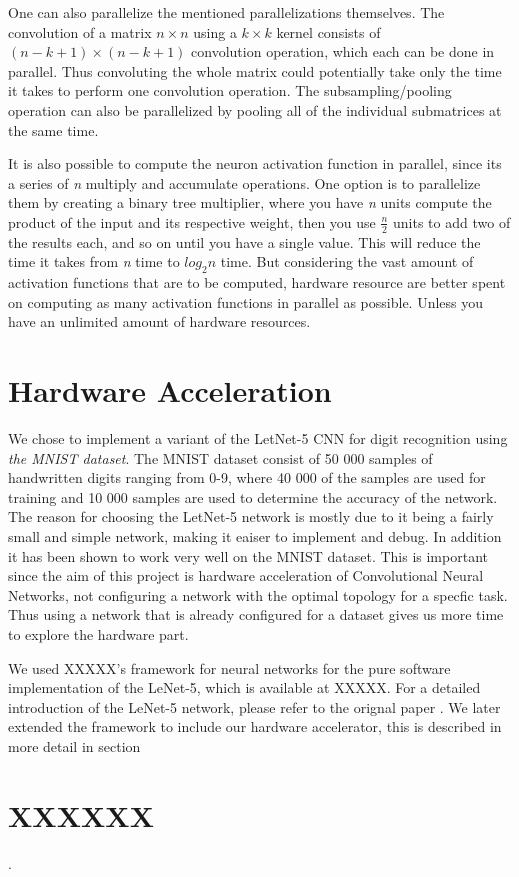 One can also parallelize the mentioned parallelizations themselves. The convolution of a matrix $ n \times n $ using a $ k \times k $ kernel consists of $ (n - k + 1) \times (n - k + 1) $ convolution operation, which each can be done in parallel. Thus convoluting the whole matrix could potentially take only the time it takes to perform one convolution operation. The subsampling/pooling operation can also be parallelized by pooling all of the individual submatrices at the same time.  
	
It is also possible to compute the neuron activation function in parallel, since its a series of  \textit{n} multiply and accumulate operations. One option is to parallelize them by creating a binary tree multiplier, where you have \textit{n} units compute the product of the input and its respective weight, then you use $ \frac{n}{2} $ units to add two of the results each, and so on until you have a single value. This will reduce the time it takes from \textit{n} time to $ log_2 n $ time. But considering the vast amount of activation functions that are to be computed, hardware resource are better spent on computing as many activation functions in parallel as possible. Unless you have an unlimited amount of hardware resources.   

\section{Hardware Acceleration}

We chose to implement a variant of the LetNet-5 CNN for digit recognition using \textit{the MNIST dataset}. 
The MNIST dataset consist of 50 000 samples of handwritten digits ranging from 0-9, where 40 000 of the samples are used for
training and 10 000 samples are used to determine the accuracy of the network. The reason for choosing the LetNet-5 network is
mostly due to it being a fairly small and simple network, making it eaiser to implement and debug. In addition it has been shown
to work very well on the MNIST dataset. This is important since the aim of this project is hardware acceleration of Convolutional
Neural Networks, not configuring a network with the optimal topology for a specfic task. Thus using a network that is already
configured for a dataset gives us more time to explore the hardware part. 

We used XXXXX's framework for neural networks for the pure software implementation of the LeNet-5, which is available at
XXXXX. For a detailed introduction of the LeNet-5 network, please refer to the orignal paper \cite{XXXXX}. We later extended the
framework to include our hardware accelerator, this is described in more detail in section \section{XXXXXX}.
